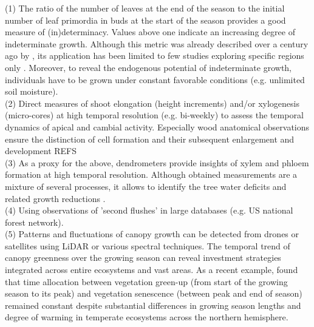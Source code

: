 \documentclass{article}
\begin{document}
	(1) The ratio of the number of leaves at the end of the season to the initial number of leaf primordia in buds at the start of the season provides a good measure of (in)determinacy. Values above one indicate an increasing degree of indeterminate growth. Although this metric was already described over a century ago by \citet{mooreStudyWinterBuds1909}, its application has been limited to few studies exploring specific regions only \citep{damascosBudCompositionBranching2005, kikuzawaLeafSurvivalWoody1983, guedonRelativeExtentsPreformation2006}. Moreover, to reveal the endogenous potential of indeterminate growth, individuals have to be grown under constant favorable conditions (e.g. unlimited soil moisture).\\
	
	(2) Direct measures of shoot elongation (height increments) and/or xylogenesis (micro-cores) at high temporal resolution (e.g. bi-weekly) to assess the temporal dynamics of apical and cambial activity. Especially wood anatomical observations ensure the distinction of cell formation and their subsequent enlargement and development REFS\\
	
	(3) As a proxy for the above, dendrometers provide insights of xylem and phloem formation at high temporal resolution. Although obtained measurements are a mixture of several processes, it allows to identify the tree water deficits and related growth reductions \cite{etzoldNumberGrowthDays2021, zweifelWhyTreesGrow2021}. \\
	
	(4) Using observations of 'second flushes' in large databases (e.g. US national forest network). \\%
	
	(5) Patterns and fluctuations of canopy growth can be detected from drones or satellites using LiDAR or various spectral techniques. The temporal trend of canopy greenness over the growing season can reveal investment strategies integrated across entire ecosystems and vast areas. As a recent example, \citet{mengConsistentTimeAllocation2024} found that time allocation between vegetation green-up (from start of the growing season to its peak) and vegetation senescence (between peak and end of season) remained constant despite substantial differences in growing season lengths and degree of warming in temperate ecosystems across the northern hemisphere.  %
\end{document}
